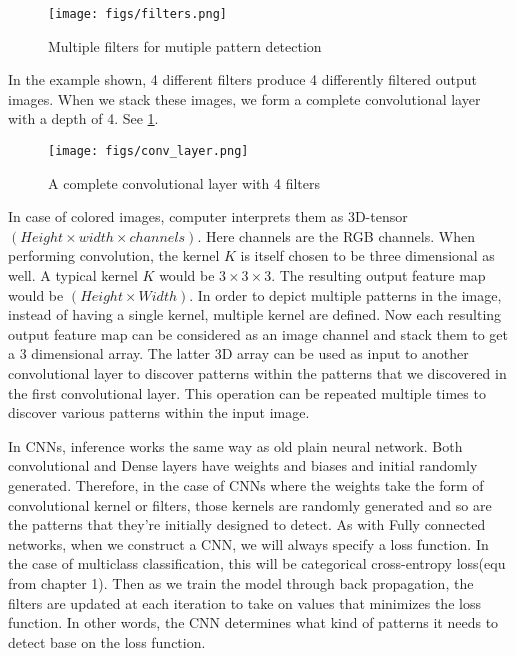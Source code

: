 \begin{figure}[!htbp]
  \centering
  \texttt{[image: figs/filters.png]}
  \caption{Multiple filters for mutiple pattern detection}
\end{figure}

In the example shown, 4 different filters produce 4 differently filtered output images.
When we stack these images, we form a complete convolutional layer with a depth of 4. See \cref{fig:conv_layer}.

\begin{figure}[!htbp]
  \centering
  \texttt{[image: figs/conv\_layer.png]}
  \caption{A complete convolutional layer with 4 filters}\label{fig:conv_layer}
\end{figure}

In case of colored images, computer interprets them as 3D-tensor $(Height \times width \times channels)$. Here channels are the RGB channels. When
performing convolution, the kernel $K$ is itself chosen to be three dimensional as well. A typical kernel $K$ would be $3 \times 3 \times 3$. The
resulting output feature map would be $(Height \times Width)$. In order to depict multiple patterns in the image, instead of having a single kernel,
multiple kernel are defined. Now each resulting output feature map can be considered as an image channel and stack them to get a 3 dimensional
array. The latter 3D array can be used as input to another convolutional layer to discover patterns within the patterns that we discovered in the
first convolutional layer. This operation can be repeated multiple times to discover various patterns within the input image.

In CNNs, inference works the same way as old plain neural network. Both convolutional and Dense layers have weights and biases and initial
randomly generated. Therefore, in the case of CNNs where the weights take the form of convolutional kernel or filters, those kernels are randomly
generated and so are the patterns that they're initially designed to detect. As with Fully connected networks, when we construct a CNN, we will
always specify a loss function. In the case of multiclass classification, this will be categorical cross-entropy loss(equ  from chapter 1). Then as
we train the model through back propagation, the filters are updated at each iteration to take on values that minimizes the loss function. In other
words, the CNN determines what kind of patterns it needs to detect base on the loss function.

